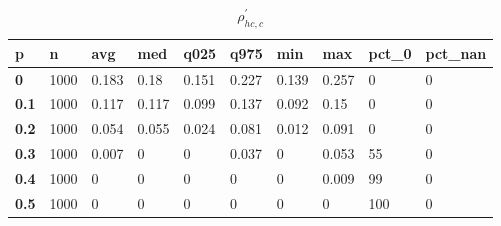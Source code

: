 \begin{table}[h]
 \centering 
\footnotesize
\caption{$\rho_{hc,c}^\prime $}
\label{tab:alphahcc}
\begin{tabular}[h]{|l|l|l|l|l|l|l|l|l|l|
    } \hline
\textbf{ p} & \textbf{ n} & \textbf{ avg} & \textbf{ med} & \textbf{ q025} & \textbf{ q975} & \textbf{ min} & \textbf{ max} & \textbf{ pct\_0} & \textbf{ pct\_nan}
    \\ \hline
  \textbf{  0} & 1000 & 0.183 &  0.18 & 0.151 & 0.227 & 0.139 & 0.257 &   0 & 0
    \\ \hline
  \textbf{0.1} & 1000 & 0.117 & 0.117 & 0.099 & 0.137 & 0.092 &  0.15 &   0 & 0
    \\ \hline
  \textbf{0.2} & 1000 & 0.054 & 0.055 & 0.024 & 0.081 & 0.012 & 0.091 &   0 & 0
    \\ \hline
  \textbf{0.3} & 1000 & 0.007 &     0 &     0 & 0.037 &     0 & 0.053 &  55 & 0
    \\ \hline
  \textbf{0.4} & 1000 &     0 &     0 &     0 &     0 &     0 & 0.009 &  99 & 0
    \\ \hline
  \textbf{0.5} & 1000 &     0 &     0 &     0 &     0 &     0 &     0 & 100 & 0
    \\ \hline
 \end{tabular}
 \end{table}
